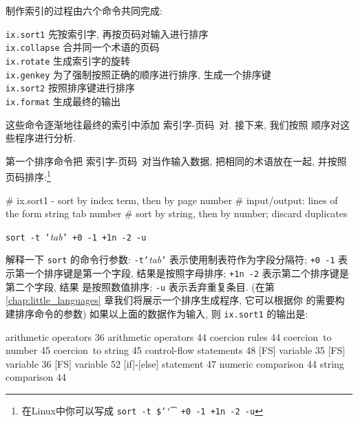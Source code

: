 制作索引的过程由六个命令共同完成:
\begin{tabbing}
\texttt{ix.sort1} \hspace{10em} \= 先按索引字, 再按页码对输入进行排序 \\
\texttt{ix.collapse}    \> 合并同一个术语的页码 \\
\texttt{ix.rotate}  \> 生成索引字的旋转 \\
\texttt{ix.genkey}  \> 为了强制按照正确的顺序进行排序, 生成一个排序键 \\
\texttt{ix.sort2}   \> 按照排序键进行排序 \\
\texttt{ix.format}  \> 生成最终的输出
\end{tabbing}
这些命令逐渐地往最终的索引中添加 \mbox{索引字}-页码\ 对. 接下来, 我们按照
顺序对这些程序进行分析.

第一个排序命令把 \mbox{索引字}-页码\ 对当作输入数据, 把相同的术语放在一起,
并按照页码排序:\footnote{ 在Linux中你可以写成
    \texttt{sort -t \$'\t' +0 -1 +1n -2 -u}}
\begin{awkcode}
    # ix.sort1 - sort by index term, then by page number
    #     input/output: lines of the form string tab number
    #     sort by string, then by number; discard duplicates
\end{awkcode}
\texttt{sort -t '}\textit{tab}\texttt{' +0 -1 +1n -2 -u} \par 
解释一下 \texttt{sort} 的命令行参数: \texttt{-t'}\textit{tab}\texttt{'}
表示使用制表符作为字段分隔符; \texttt{+0 -1} 表示第一个排序键是第一个字段,
结果是按照字母排序; \texttt{+1n -2} 表示第二个排序键是第二个字段, 结果 
是按照数值排序; \texttt{-u} 表示丢弃重复条目. (在第
\ref{chap:little_languages} 章我们将展示一个排序生成程序, 它可以根据你
的需要构建排序命令的参数) 如果以上面的数据作为输入, 则 \texttt{ix.sort1}
的输出是:
\begin{file}
    arithmetic operators        36
    arithmetic operators        44
    coercion rules      44
    coercion~to number  45
    coercion~to string  45
    control-flow statements     48
    [FS] variable       35
    [FS] variable       36
    [FS] variable       52
    [if]-[else] statement       47
    numeric comparison  44
    string comparison   44
\end{file}

